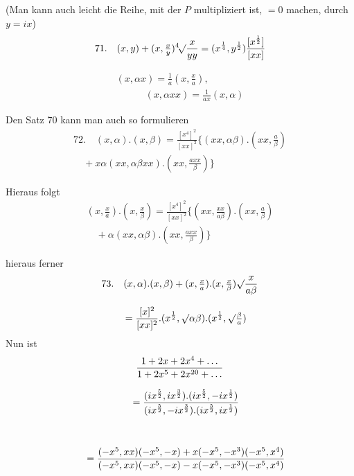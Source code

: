(Man kann auch leicht die Reihe, mit der $P$ multipliziert ist, $=0$ machen,
durch $y=ix$)
\[
71.\quad{}
(x,y)+(x,\tfrac xy)\mathord{{}^{4}\!\surd}{\frac x{yy}}
 =(x^{\frac14},y^{\frac12})\frac{[x^{\frac12}]}{[xx]}
\]

\[
\begin{gathered}(x,\alpha x)=\frac1a(x,\tfrac xa),
\\[8pt]\quad{}\qquad
(x,\alpha xx)=\frac1{ax}(x,\alpha)\end{gathered}
\]

Den Satz 70 kann man auch so formulieren
\[
\begin{gathered}72.\quad{}
(x,\alpha).(x,\beta)=\frac{[x^4]^2}{[xx]^2}
 \{(xx,\alpha\beta).(xx,\tfrac a\beta)
 \\[8pt]\quad{}+x\alpha(xx,\alpha\beta xx).(xx,\tfrac{axx}\beta)\}\end{gathered}
\]

Hieraus folgt
\[
\begin{gathered}(x,\tfrac xa).(x,\tfrac x\beta)=\frac{[x^4]^2}{[xx]^2}
 \{(xx,\tfrac{xx}{a\beta}).(xx,\tfrac a\beta)
 \\[8pt]\quad{}+\alpha(xx,\alpha\beta).(xx,\tfrac{axx}\beta)\}\end{gathered}
\]

hieraus ferner
\[
\begin{gathered}73.\quad{}
(x,\alpha).(x,\beta)+(x,\tfrac xa).(x,\tfrac x\beta)\mathord{\surd}{\frac x{a\beta}}
 \\[8pt]\quad{}=\frac{[x]^2}{[xx]^2}.(x^{\frac12},\mathord{\surd}{\alpha\beta}).(x^{\frac12},\mathord{\surd}{\tfrac\beta a})\end{gathered}
\]
Nun ist
\[
\begin{gathered}
\frac{1+2x+2x^4+\mathinner{.\,.\,.}}{1+2x^5+2x^{20}+\mathinner{.\,.\,.}}
\\[8pt]\quad{}=\frac{(ix^{\frac52},ix^{\frac32}).(ix^{\frac52},-ix^{\frac12})}
 {(ix^{\frac52},-ix^{\frac32}).(ix^{\frac52},ix^{\frac12})}\\[1ex]
\\[8pt]\quad{}=\frac{(-x^5,xx)(-x^5,-x)+x(-x^5,-x^3)(-x^5,x^4)}
 {(-x^5,xx)(-x^5,-x)-x(-x^5,-x^3)(-x^5,x^4)}
\end{gathered}
\]

